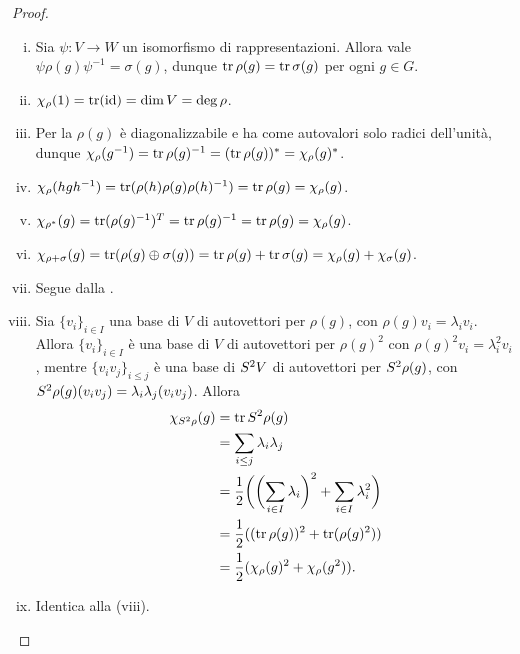 \begin{proof}
\leavevmode
\begin{enumerate}[(i)]
\item Sia $\psi:V\to W$ un isomorfismo di rappresentazioni. Allora vale $\psi\rho(g)\psi^{-1}=\sigma(g)$, dunque $\operatorname{tr}\rho(g)=\operatorname{tr}\sigma(g)$ per ogni $g\in G$.
\item $\chi_\rho(1)=\operatorname{tr}(\operatorname{id})=\dim V=\deg\rho$.
\item Per la  $\rho(g)$ è diagonalizzabile e ha come autovalori solo radici dell'unità, dunque $\chi_\rho(g^{-1})=\operatorname{tr}\rho(g)^{-1}=(\operatorname{tr}\rho(g))^*=\chi_\rho(g)^*$.
\item $\chi_\rho(hgh^{-1})=\operatorname{tr}(\rho(h)\rho(g)\rho(h)^{-1})=\operatorname{tr}\rho(g)=\chi_\rho(g)$.
\item $\chi_{\rho^*}(g)=\operatorname{tr}(\rho(g)^{-1})^T=\operatorname{tr}\rho(g)^{-1}=\operatorname{tr}\rho(g)=\chi_\rho(g)$.
\item $\chi_{\rho+\sigma}(g)=\operatorname{tr}(\rho(g)\oplus\sigma(g))=\operatorname{tr}\rho(g)+\operatorname{tr}\sigma(g)=\chi_\rho(g)+\chi_\sigma(g)$.
\item Segue dalla .
\item Sia $\{v_i\}_{i\in I}$ una base di $V$ di autovettori per $\rho(g)$, con $\rho(g)v_i=\lambda_iv_i$. Allora $\{v_i\}_{i\in I}$ è una base di $V$ di autovettori per $\rho(g)^2$ con $\rho(g)^2v_i=\lambda_i^2v_i$, mentre $\{v_iv_j\}_{i\le j}$ è una base di $S^2V$ di autovettori per $S^2\rho(g)$, con $S^2\rho(g)(v_iv_j)=\lambda_i\lambda_j(v_iv_j)$. Allora
\begin{align*}
\chi_{S^2\rho}(g)&=\operatorname{tr}S^2\rho(g)\\
&=\sum_{i\le j}\lambda_i\lambda_j\\
&=\frac{1}{2}\biggl(\biggl(\sum_{i\in I}\lambda_i\biggr)^2+\sum_{i\in I}\lambda_i^2\biggr)\\
&=\frac{1}{2}((\operatorname{tr}\rho(g))^2+\operatorname{tr}(\rho(g)^2))\\
&=\frac{1}{2}(\chi_\rho(g)^2+\chi_\rho(g^2)).
\end{align*}
\item Identica alla (viii).
\end{enumerate}
\end{proof}

